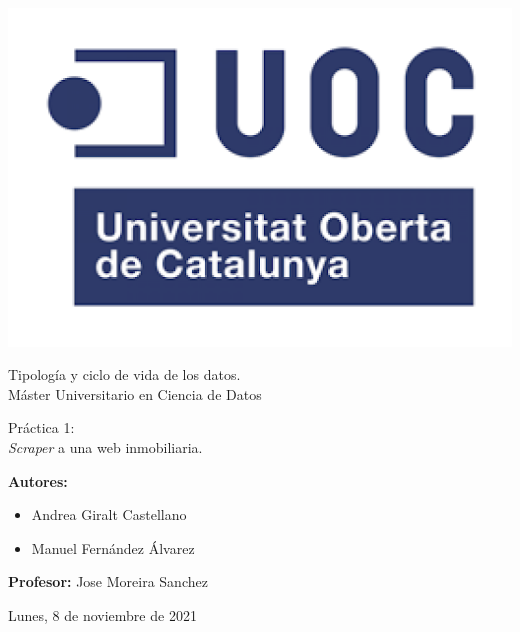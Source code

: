 \documentclass[a4paper, 12pt]{article}
\begin{document}
\begin{titlepage}

	\begin{flushright}
		\includegraphics[scale=0.25]{img/logo.png}
	\end{flushright}

\vspace{3cm}
\begin{center}
{\Large
Tipología y ciclo de vida de los datos.\\


Máster Universitario en Ciencia de Datos

}
\end{center}
\vspace{3.8cm}
\begin{flushleft}
{\Large
Práctica 1:}\\ 
\vspace{0.20cm}
{\Large
{\itshape Scraper} a una web inmobiliaria.
\\ }

\vspace{1.8cm}

\textbf{Autores:} 
\begin{itemize}
	\item Andrea Giralt Castellano
	\item Manuel Fernández Álvarez
\end{itemize}

\textbf{Profesor:} Jose Moreira Sanchez \\ 

\end{flushleft}

\begin{flushleft}
Lunes, 8 de noviembre de 2021
\end{flushleft}

\end{titlepage}
\end{document}
